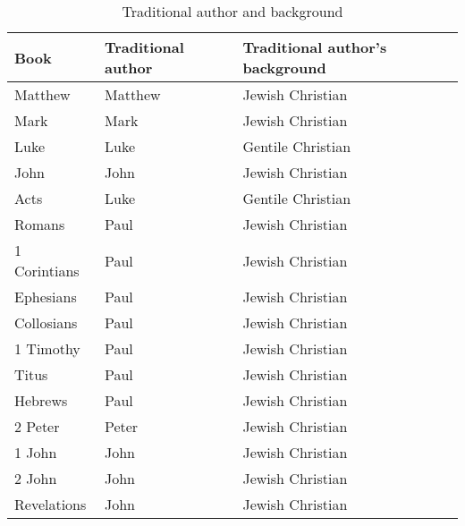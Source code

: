 \documentclass{article}
\begin{document}
\begin{table}
    \centering
    \renewcommand\arraystretch{1.3}
    \begin{tabular}{@{}lll@{}}
    \toprule
        Book & Traditional author & Traditional author's background \\
    \midrule
        Matthew & Matthew & Jewish Christian \\
        Mark & Mark & Jewish Christian \\
        Luke & Luke & Gentile Christian \\
        John & John & Jewish Christian \\
        Acts & Luke & Gentile Christian \\
        Romans & Paul & Jewish Christian \\
        1 Corintians & Paul & Jewish Christian \\
        Ephesians & Paul & Jewish Christian \\
        Collosians & Paul & Jewish Christian \\
        1 Timothy & Paul & Jewish Christian \\
        Titus & Paul & Jewish Christian \\
        Hebrews & Paul & Jewish Christian \\
        2 Peter & Peter & Jewish Christian \\
        1 John & John & Jewish Christian \\
        2 John & John & Jewish Christian \\
        Revelations & John & Jewish Christian \\
    \bottomrule
    \end{tabular}
    \caption{Traditional author and background}
    \label{traditionalauthor}
\end{table}
\end{document}
